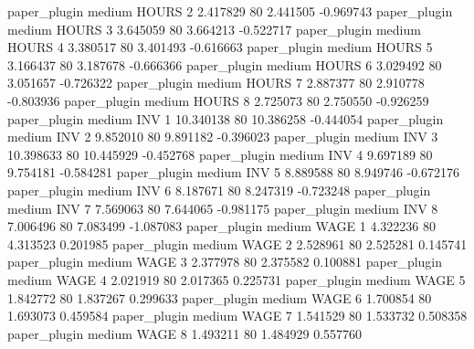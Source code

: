   paper_plugin     medium    HOURS                 2  2.417829 80       2.441505          -0.969743
  paper_plugin     medium    HOURS                 3  3.645059 80       3.664213          -0.522717
  paper_plugin     medium    HOURS                 4  3.380517 80       3.401493          -0.616663
  paper_plugin     medium    HOURS                 5  3.166437 80       3.187678          -0.666366
  paper_plugin     medium    HOURS                 6  3.029492 80       3.051657          -0.726322
  paper_plugin     medium    HOURS                 7  2.887377 80       2.910778          -0.803936
  paper_plugin     medium    HOURS                 8  2.725073 80       2.750550          -0.926259
  paper_plugin     medium      INV                 1 10.340138 80      10.386258          -0.444054
  paper_plugin     medium      INV                 2  9.852010 80       9.891182          -0.396023
  paper_plugin     medium      INV                 3 10.398633 80      10.445929          -0.452768
  paper_plugin     medium      INV                 4  9.697189 80       9.754181          -0.584281
  paper_plugin     medium      INV                 5  8.889588 80       8.949746          -0.672176
  paper_plugin     medium      INV                 6  8.187671 80       8.247319          -0.723248
  paper_plugin     medium      INV                 7  7.569063 80       7.644065          -0.981175
  paper_plugin     medium      INV                 8  7.006496 80       7.083499          -1.087083
  paper_plugin     medium     WAGE                 1  4.322236 80       4.313523           0.201985
  paper_plugin     medium     WAGE                 2  2.528961 80       2.525281           0.145741
  paper_plugin     medium     WAGE                 3  2.377978 80       2.375582           0.100881
  paper_plugin     medium     WAGE                 4  2.021919 80       2.017365           0.225731
  paper_plugin     medium     WAGE                 5  1.842772 80       1.837267           0.299633
  paper_plugin     medium     WAGE                 6  1.700854 80       1.693073           0.459584
  paper_plugin     medium     WAGE                 7  1.541529 80       1.533732           0.508358
  paper_plugin     medium     WAGE                 8  1.493211 80       1.484929           0.557760